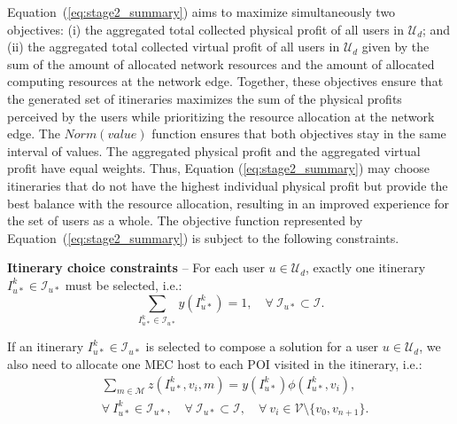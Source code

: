 Equation~(\ref{eq:stage2_summary}) aims to maximize simultaneously two objectives: (i) the aggregated total collected physical profit of all users in $\mathcal{U}_d$; and (ii) the aggregated total collected virtual profit of all users in $\mathcal{U}_d$ given by the sum of the amount of allocated network resources and the amount of allocated computing resources at the network edge. Together, these objectives ensure that the generated set of itineraries maximizes the sum of the physical profits perceived by the users while prioritizing the resource allocation at the network edge. The $Norm(value)$ function ensures that both objectives stay in the same interval of values. The aggregated physical profit and the aggregated virtual profit have equal weights. Thus, Equation (\ref{eq:stage2_summary}) may choose itineraries that do not have the highest individual physical profit but provide the best balance with the resource allocation, resulting in an improved experience for the set of users as a whole. The objective function represented by Equation~(\ref{eq:stage2_summary}) is subject to the following constraints.

\textbf{Itinerary choice constraints} -- For each user $u \in \mathcal{U}_d$, exactly one itinerary $I_{u*}^k \in \mathcal{I}_{u*}$ must be {selected}, i.e.:
\begin{equation}
\label{eq:one_itinerary_1}
\sum\limits_{I_{u*}^k \in \mathcal{I}_{u*}} y(I_{u*}^k)=1, {\quad \forall \ \mathcal{I}_{u*} \subset \mathcal{I}}.
\end{equation}

If an itinerary $I_{u*}^k \in \mathcal{I}_{u*}$ is {selected} to compose a solution for a user $u \in \mathcal{U}_d$, we also need to allocate one MEC host to each POI visited in the itinerary, i.e.:
\begin{equation}
\label{eq:mec_itinerary_1}
\begin{split}
& \sum\limits_{m \in \mathcal{M}} z(I_{u*}^k,v_{i},m)=y(I_{u*}^k) \phi(I_{u*}^k, v_{i}), \\
& {\forall \ I_{u*}^k \in \mathcal{I}_{u*}}, {\quad \forall \ \mathcal{I}_{u*} \subset \mathcal{I}}, {\quad \forall \ v_{i} \in \mathcal{V} \setminus \{v_{0}, v_{n+1}\}}.
\end{split}
\end{equation}

